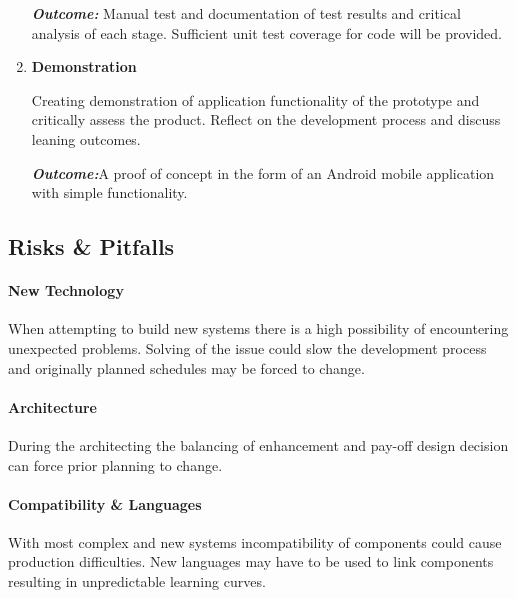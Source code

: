 \documentclass[a4paper, 11pt]{article}
\begin{document}
\begin{enumerate}
\begin{flushleft}
	\emph{\textbf{Outcome:}} Manual test and documentation of test results and critical analysis of each stage. Sufficient unit test coverage for code will be provided.
	\vspace{\baselineskip}
  	\end{flushleft}
	   \item \textbf{Demonstration}
   	\begin{flushleft}Creating demonstration of application functionality of the prototype and critically assess the product. Reflect on the development process and discuss leaning outcomes. 
	
	\emph{\textbf{Outcome:}}A proof of concept in the form of an Android mobile application with simple functionality.
	  	\end{flushleft}
\end{enumerate}
\vspace{\baselineskip}


\vspace{\baselineskip}
\vspace{\baselineskip}
\vspace{\baselineskip}

\subsection{Risks \& Pitfalls}
\paragraph{New Technology}When attempting to build new systems there is a high possibility of encountering unexpected problems. Solving of the issue could slow the development process and originally planned schedules may be forced to change. 

\paragraph{Architecture}During the architecting the balancing of enhancement and pay-off design decision can force prior planning to change. 

\paragraph{Compatibility \& Languages}With most complex and new systems incompatibility of components could cause production difficulties. New languages may have to be used to link components resulting in unpredictable learning curves.
\clearpage
\end{document}
